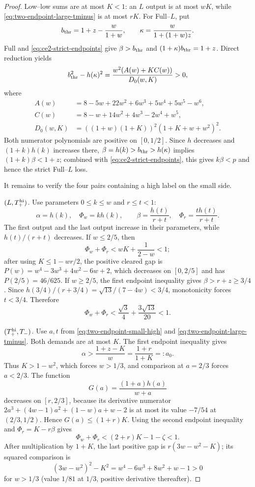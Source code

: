 \begin{proof}
Low--low sums are at most $K<1$: an $L$ output is at most $wK$, while
\eqref{eq:two-endpoint-large-tminus} is at most $rK$.  For Full--$L$, put
\[
 b_{\rm thr}=1+z-\frac{w}{1+w},\qquad
 \kappa=\frac{w}{1+(1+w)z}.
\]
Full and \eqref{eq:ce2-strict-endpoints} give $\beta>b_{\rm thr}$ and
$(1+\kappa)b_{\rm thr}=1+z$.  Direct reduction yields
\[
 b_{\rm thr}^2-h(\kappa)^2
 =\frac{w^2(A(w)+KC(w))}{D_0(w,K)}>0,
\]
where
\begin{align*}
 A(w)&=8-5w+22w^2+6w^3+5w^4+5w^5-w^6,\\
 C(w)&=8-w+14w^2+4w^3-2w^4+w^5,\\
 D_0(w,K)&=((1+w)(1+K))^2(1+K+w+w^2)^2.
\end{align*}
Both numerator polynomials are positive on $[0,1/2]$.  Since $h$ decreases
and $(1+k)h(k)$ increases there,
$\beta=h(k)>b_{\rm thr}>h(\kappa)$ implies
$(1+k)\beta<1+z$; combined with \eqref{eq:ce2-strict-endpoints}, this gives
$k\beta<p$ and hence the strict Full--$L$ loss.

It remains to verify the four pairs containing a high label on the small
side.

\smallskip\noindent
\emph{$(L,T_+^{\rm hi})$.}
Use parameters $0\le k\le w$ and $r\le t<1$:
\[
 \alpha=h(k),\quad\Phi_w=kh(k),\qquad
 \beta=\frac{h(t)}{r+t},\quad\Phi_r=\frac{th(t)}{r+t}.
\]
The first output and the last output increase in their parameters, while
$h(t)/(r+t)$ decreases.  If $w\le2/5$, then
\[
 \Phi_w+\Phi_r<wK+\frac1{2-w}<1;
\]
after using $K\le1-wr/2$, the positive cleared gap is
$P(w)=w^4-3w^3+4w^2-6w+2$, which decreases on $[0,2/5]$ and has
$P(2/5)=46/625$.  If $w\ge2/5$, the first endpoint inequality gives
$\beta>r+z\ge3/4$.  Since
$h(3/4)/(r+3/4)=\sqrt{13}/(7-4w)<3/4$, monotonicity forces $t<3/4$.
Therefore
\[
 \Phi_w+\Phi_r<\frac{\sqrt3}{4}+\frac{3\sqrt{13}}{20}<1.
\]

\smallskip\noindent
\emph{$(T_+^{\rm hi},T_-)$.}
Use $a,t$ from \eqref{eq:two-endpoint-small-high} and
\eqref{eq:two-endpoint-large-tminus}.  Both demands are at most $K$.
The first endpoint inequality gives
\[
 \alpha>\frac{1+z-K}{w}=\frac{1+r}{1+K}=:a_0.
\]
Thus $K>1-w^2$, which forces $w>1/3$, and comparison at $a=2/3$ forces
$a<2/3$.  The function
\[
 G(a)=\frac{(1+a)h(a)}{w+a}
\]
decreases on $[r,2/3]$, because its derivative numerator
$2a^3+(4w-1)a^2+(1-w)a+w-2$ is at most its value
$-7/54$ at $(2/3,1/2)$.  Hence $G(a)\le(1+r)K$.
Using the second endpoint inequality and
$\Phi_r=K-r\beta$ gives
\[
 \Phi_w+\Phi_r<(2+r)K-1-\zeta<1.
\]
After multiplication by $1+K$, the last positive gap is
$r(3w-w^2-K)$; its squared comparison is
\[
 (3w-w^2)^2-K^2=w^4-6w^3+8w^2+w-1>0
\]
for $w>1/3$ (value $1/81$ at $1/3$, positive derivative thereafter).


\end{proof}
